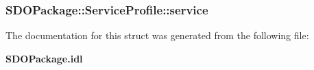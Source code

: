 \subsubsection{ {\bf SDOPackage::Service\-Profile::service}}\label{structSDOPackage_1_1ServiceProfile_SDOPackage_1_1ServiceProfileo3}




The documentation for this struct was generated from the following file:\begin{CompactItemize}
\item 
{\bf SDOPackage.idl}\end{CompactItemize}
